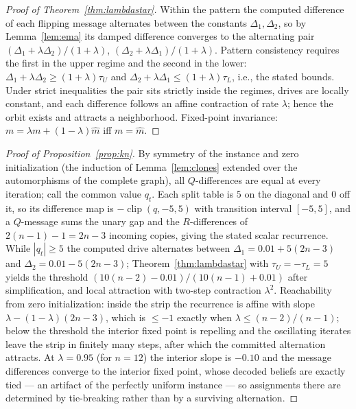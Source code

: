 \documentclass[letterpaper]{article} %
\theoremstyle{definition}
\theoremstyle{remark}
\begin{document}
\begin{proof}[Proof of Theorem~\ref{thm:lambdastar}]
Within the pattern the computed difference of each flipping message
alternates between the constants $\Delta_1, \Delta_2$, so by
Lemma~\ref{lem:ema} its damped difference converges to the alternating
pair $(\Delta_1 + \lambda\Delta_2)/(1+\lambda)$,
$(\Delta_2 + \lambda\Delta_1)/(1+\lambda)$.  Pattern consistency requires
the first in the upper regime and the second in the lower:
$\Delta_1 + \lambda\Delta_2 \ge (1+\lambda)\tau_U$ and
$\Delta_2 + \lambda\Delta_1 \le (1+\lambda)\tau_L$, i.e., the stated
bounds.  Under strict inequalities the pair sits strictly inside the
regimes, drives are locally constant, and each difference follows an
affine contraction of rate $\lambda$; hence the orbit exists and attracts
a neighborhood.  Fixed-point invariance:
$m = \lambda m + (1-\lambda)\widehat{m}$ iff $m = \widehat{m}$.
\end{proof}

\begin{proof}[Proof of Proposition~\ref{prop:kn}]
By symmetry of the instance and zero initialization (the induction of
Lemma~\ref{lem:clones} extended over the automorphisms of the complete
graph), all $Q$-differences are equal at every iteration; call the
common value $q_t$.  Each split table is $5$ on the diagonal and $0$ off
it, so its difference map is $-\operatorname{clip}(q, -5, 5)$ with
transition interval $[-5, 5]$, and a $Q$-message sums the unary gap and
the $R$-differences of $2(n-1) - 1 = 2n-3$ incoming copies, giving the
stated scalar recurrence.  While $|q_t| \ge 5$ the computed drive
alternates between $\Delta_1 = 0.01 + 5(2n-3)$ and
$\Delta_2 = 0.01 - 5(2n-3)$; Theorem~\ref{thm:lambdastar} with
$\tau_U = -\tau_L = 5$ yields the threshold
$(10(n-2) - 0.01)/(10(n-1) + 0.01)$ after simplification, and local
attraction with two-step contraction $\lambda^{2}$.  Reachability from
zero initialization: inside the strip the recurrence is affine with slope
$\lambda - (1-\lambda)(2n-3)$, which is $\le -1$ exactly when
$\lambda \le (n-2)/(n-1)$; below the threshold the interior fixed point
is repelling and the oscillating iterates leave the strip in finitely
many steps, after which the committed alternation attracts.  At
$\lambda = 0.95$ (for $n = 12$) the interior slope is $-0.10$ and the
message differences converge to the interior fixed point, whose decoded
beliefs are exactly tied --- an artifact of the perfectly uniform
instance --- so assignments there are determined by tie-breaking rather
than by a surviving alternation.
\end{proof}
\end{document}
